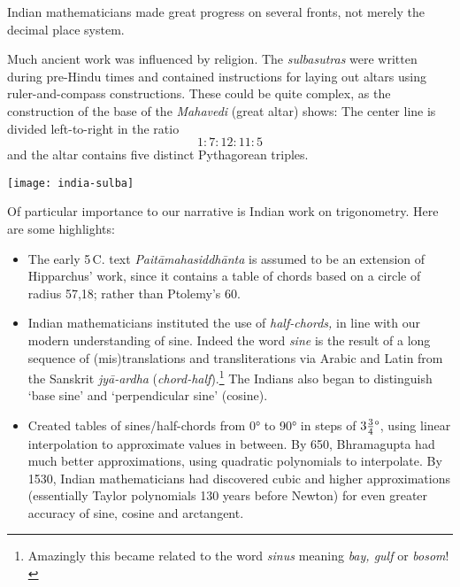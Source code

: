 \label{pg:Mahavedi}

Indian mathematicians made great progress on several fronts, not merely the decimal place system.\par
\begin{minipage}[t]{0.55\linewidth}\vspace{0pt}
	Much ancient work was influenced by religion. The \emph{sulbasutras} were written during pre-Hindu times and contained instructions for laying out altars using ruler-and-compass constructions. These could be quite complex, as the construction of the base of the \emph{Mahavedi} (great altar) shows: The center line is divided left-to-right in the ratio
	\[
		1:7:12:11:5
	\]
	and the altar contains five distinct Pythagorean triples.
\end{minipage}
\hfill
\begin{minipage}[t]{0.42\linewidth}\vspace{0pt}
	\flushright
	\texttt{[image: india-sulba]}
\end{minipage}
\medbreak

Of particular importance to our narrative is Indian work on trigonometry. Here are some highlights:
\begin{itemize}
  \item The early 5\th\,C.{} text \emph{Paitāmahasiddhānta} is assumed to be an extension of Hipparchus' work, since it contains a table of chords based on a circle of radius 57,18; rather than Ptolemy's 60.
  \item Indian mathematicians instituted the use of \emph{half-chords,} in line with our modern understanding of sine. Indeed the word \emph{sine} is the result of a long sequence of (mis)translations and transliterations via Arabic and Latin from the Sanskrit \emph{jyā-ardha} (\emph{chord-half}).\footnote{Amazingly this became related to the word \emph{sinus} meaning \emph{bay, gulf} or \emph{bosom}!} The Indians also began to distinguish `base sine' and `perpendicular sine' (cosine).
  \item Created tables of sines/half-chords from \ang{0} to \ang{90} in steps of $\ang{3\frac 34}$, using linear interpolation to approximate values in between. By 650, Bhramagupta had much better approximations, using quadratic polynomials to interpolate. By 1530, Indian mathematicians had discovered cubic and higher approximations (essentially Taylor polynomials 130 years before Newton) for even greater accuracy of sine, cosine and arctangent.
\end{itemize}

